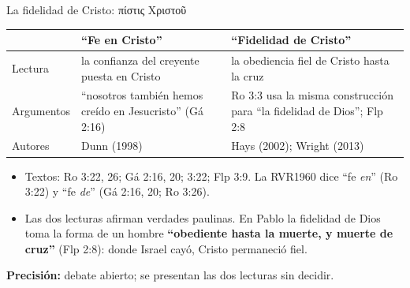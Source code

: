 \documentclass[hyperref={bookmarks=false},aspectratio=169]{beamer}
\newcommand{\grc}[1]{\foreignlanguage{ancientgreek}{#1}}
\newcommand{\destacar}[1]{\textbf{\textcolor{azul}{#1}}}
\newcommand{\precision}[1]{{\footnotesize\color{gris}\textbf{Precisión:} #1}}
\begin{document}
\begin{frame}{La fidelidad de Cristo: \grc{πίστις Χριστοῦ}}
\scriptsize\renewcommand{\arraystretch}{1.18}
\begin{tabular}{@{}>{\RaggedRight\arraybackslash}p{2.0cm}>{\RaggedRight\arraybackslash}p{4.9cm}>{\RaggedRight\arraybackslash}p{4.9cm}@{}}
\toprule
 & \textbf{``Fe en Cristo''} & \textbf{``Fidelidad de Cristo''} \\ \midrule
Lectura & la confianza del creyente puesta en Cristo & la obediencia fiel de Cristo hasta la cruz \\
Argumentos & ``nosotros también hemos creído en Jesucristo'' (Gá 2:16) & Ro 3:3 usa la misma construcción para ``la fidelidad de Dios''; Flp 2:8 \\
Autores & Dunn (1998) & Hays (2002); Wright (2013) \\
\bottomrule
\end{tabular}\par\medskip
\small
\begin{itemize}
\item Textos: Ro 3:22, 26; Gá 2:16, 20; 3:22; Flp 3:9. La RVR1960 dice ``fe \emph{en}'' (Ro 3:22) y ``fe \emph{de}'' (Gá 2:16, 20; Ro 3:26).
\item Las dos lecturas afirman verdades paulinas. En Pablo la fidelidad de Dios toma la forma de un hombre \destacar{``obediente hasta la muerte, y muerte de cruz''} (Flp 2:8): donde Israel cayó, Cristo permaneció fiel.
\end{itemize}
\precision{debate abierto; se presentan las dos lecturas sin decidir.}
\end{frame}
\end{document}
